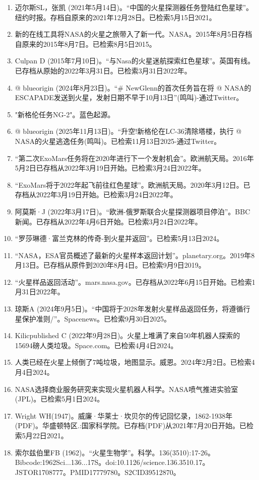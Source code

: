 \begin{enumerate}
\item 迈尔斯SL，张凯 (2021年5月14日)。“中国的火星探测器任务登陆红色星球”。纽约时报。存档自原来的2021年12月28日。已检索5月15日2021。
\item 新的在线工具将NASA的火星之旅带入了新一代。NASA。2015年8月5日存档自原来的2015年8月7日。已检索8月5日2015。
\item Culpan D (2015年7月10日)。“与Nasa的火星迷航探索红色星球”。英国有线。已存档从原始的2022年3月31日。已检索3月31日2022年。
\item @ blueorigin (2024年8月23日)。“# NewGlenn的首次任务旨在将 @ NASA的ESCAPADE发送到火星，发射日期不早于10月13日”(鸣叫)-通过Twitter。
\item "新格伦任务NG-2"。蓝色起源。
\item @ blueorigin (2025年11月13日)。“升空!新格伦在LC-36清除塔楼，执行 @ NASA的火星逃逸任务(鸣叫)。已检索11月13日2025-通过Twitter。
\item “第二次ExoMars任务将在2020年进行下一个发射机会”。欧洲航天局。2016年5月2日已存档从2022年3月19日开始。已检索3月24日2022年。
\item “ExoMars将于2022年起飞前往红色星球”。欧洲航天局。2020年3月12日。已存档从2022年3月19日开始。已检索3月24日2022年。
\item 阿莫斯·J (2022年3月17日)。“欧洲-俄罗斯联合火星探测器项目停泊”。BBC新闻。已存档从2022年4月6日开始。已检索3月24日2022年。
\item “罗莎琳德·富兰克林的传奇-到火星并返回”。已检索5月13日2024。
\item “NASA，ESA官员概述了最新的火星样本返回计划”。planetary.org。2019年8月13日。已存档从原件到2020年8月4日。已检索9月9日2019。
\item “火星样品返回活动”。mars.nasa.gov。已存档从2022年6月15日开始。已检索1月31日2022年。
\item 琼斯A (2024年9月5日)。“中国将于2028年发射火星样品返回任务，将遵循行星保护准则/”。Spacenews。已检索9月30日2025。
\item Kilicpublished C (2022年9月28日)。火星上堆满了来自50年机器人探索的15694磅人类垃圾。Space.com。已检索4月4日2024。
\item 人类已经在火星上倾倒了7吨垃圾，地图显示。威恩。2024年2月2日。已检索4月4日2024。
\item NASA选择商业服务研究来实现火星机器人科学。NASA喷气推进实验室 (JPL)。已检索5月1日2024。
\item Wright WH(1947)。威廉·华莱士·坎贝尔的传记回忆录，1862-1938年(PDF)。华盛顿特区.:国家科学院。已存档(PDF)从2021年7月20日开始。已检索5月22日2021。
\item 索尔兹伯里FB (1962)。“火星生物学”。科学。136(3510):17-26。Bibcode:1962Sci...136...17S。doi:10.1126/science.136.3510.17。JSTOR1708777。PMID17779780。S2CID39512870。   

\end{enumerate}
